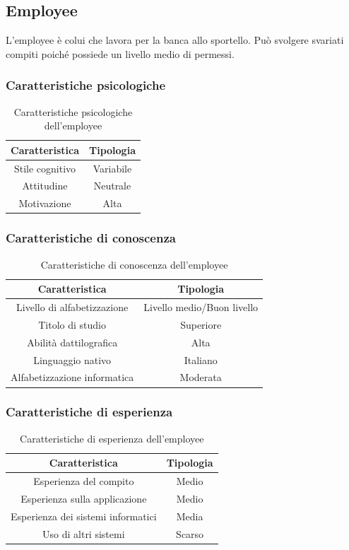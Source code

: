 \clearpage
\subsection{Employee}
L'employee è colui che lavora per la banca allo sportello. Può svolgere svariati compiti poiché possiede un livello medio di permessi.

\subsubsection{Caratteristiche psicologiche}
\begin{table}[h]
	\centering
	\begin{tabular}{|c|c|}
		\hline
		\textbf{Caratteristica} & \textbf{Tipologia} \\
		\hline
		Stile cognitivo & Variabile \\
		\hline
		Attitudine & Neutrale \\
		\hline
		Motivazione & Alta \\
		\hline
	\end{tabular}
	\caption{Caratteristiche psicologiche dell'employee}
\end{table}

\subsubsection{Caratteristiche di conoscenza}
\begin{table}[h]
	\centering
	\begin{tabular}{|c|c|}
		\hline
		\textbf{Caratteristica} & \textbf{Tipologia} \\
		\hline
		Livello di alfabetizzazione & Livello medio/Buon livello \\
		\hline
		Titolo di studio & Superiore \\
		\hline
		Abilità dattilografica & Alta \\
		\hline
		Linguaggio nativo & Italiano \\
		\hline
		Alfabetizzazione informatica & Moderata \\
		\hline
	\end{tabular}
	\caption{Caratteristiche di conoscenza dell'employee}
\end{table}

\subsubsection{Caratteristiche di esperienza}
\begin{table}[h]
	\centering
	\begin{tabular}{|c|c|}
		\hline
		\textbf{Caratteristica} & \textbf{Tipologia} \\
		\hline
		Esperienza del compito & Medio \\
		\hline
		Esperienza sulla applicazione & Medio \\
		\hline
		Esperienza dei sistemi informatici & Media \\
		\hline
		Uso di altri sistemi & Scarso \\
		\hline
	\end{tabular}
	\caption{Caratteristiche di esperienza dell'employee}
\end{table}

